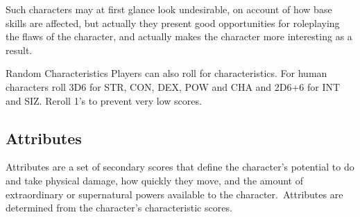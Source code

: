 Such characters may at first glance look undesirable, on account of how base skills are affected, but actually they present good opportunities for roleplaying the flaws of the character, and actually makes the character more interesting as a result.

\vspace{3mm}
\begin{rpg-titlebox}{Random Characteristics}
Players can also roll for characteristics. For human characters roll 3D6 for STR, CON, DEX, POW and CHA and 2D6+6 for INT and SIZ. Reroll 1's to prevent very low scores.
\end{rpg-titlebox}




\subsection{Attributes}
Attributes are a set of secondary scores that define the character’s potential to do and take physical damage, how quickly they move, and the amount of extraordinary or supernatural powers available to the character. Attributes are determined from the character’s characteristic scores. 

